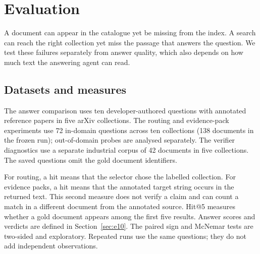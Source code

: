 \section{Evaluation}
\label{sec:eval}
A document can appear in the catalogue yet be missing from the index. A
search can reach the right collection yet miss the passage that answers the
question. We test these failures separately from answer quality, which also
depends on how much text the answering agent can read.

\subsection{Datasets and measures}\label{sec:eval-setup}
The answer comparison uses ten developer-authored questions with annotated
reference papers in five arXiv collections. The routing and evidence-pack
experiments use 72 in-domain questions across ten collections (138 documents
in the frozen run); out-of-domain probes are analysed separately. The
verifier diagnostics use a separate industrial corpus of 42 documents in
five collections. The saved questions omit the gold document identifiers.

For routing, a hit means that the selector chose the labelled collection.
For evidence packs, a hit means that the annotated target string occurs in
the returned text. This second measure does not verify a claim and can count
a match in a different document from the annotated source. Hit@5 measures
whether a gold document appears among the first five results. Answer scores
and verdicts are defined in Section~\ref{sec:e10}. The paired sign and
McNemar tests are two-sided and exploratory. Repeated runs use the same
questions; they do not add independent observations.

